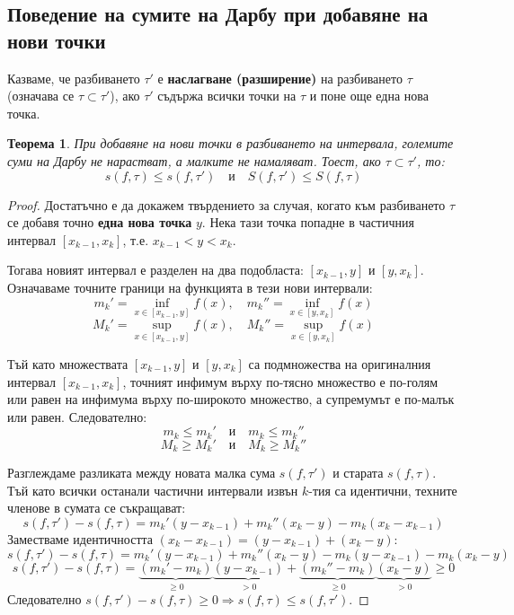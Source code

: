 \documentclass{scrartcl}
\newtheorem{theorem}{Теорема}
\begin{document}
\begin{FlushLeft}
\subsection{Поведение на сумите на Дарбу при добавяне на нови точки}

Казваме, че разбиването $\tau'$ е \textbf{наслагване (разширение)} на разбиването $\tau$ (означава се $\tau \subset \tau'$), ако $\tau'$ съдържа всички точки на $\tau$ и поне още една нова точка.

\begin{theorem}
При добавяне на нови точки в разбиването на интервала, големите суми на Дарбу не нарастват, а малките не намаляват. Тоест, ако $\tau \subset \tau'$, то:
\[ s(f, \tau) \le s(f, \tau') \quad \text{и} \quad S(f, \tau') \le S(f, \tau) \]
\end{theorem}

\begin{proof}
Достатъчно е да докажем твърдението за случая, когато към разбиването $\tau$ се добавя точно \textbf{една нова точка} $y$. Нека тази точка попадне в частичния интервал $[x_{k-1}, x_k]$, т.е. $x_{k-1} < y < x_k$.

Тогава новият интервал е разделен на два подобласта: $[x_{k-1}, y]$ и $[y, x_k]$. Означаваме точните граници на функцията в тези нови интервали:
\[ m_k' = \inf_{x \in [x_{k-1}, y]} f(x), \quad m_k'' = \inf_{x \in [y, x_k]} f(x) \]
\[ M_k' = \sup_{x \in [x_{k-1}, y]} f(x), \quad M_k'' = \sup_{x \in [y, x_k]} f(x) \]

Тъй като множествата $[x_{k-1}, y]$ и $[y, x_k]$ са подмножества на оригиналния интервал $[x_{k-1}, x_k]$, точният инфимум върху по-тясно множество е по-голям или равен на инфимума върху по-широкото множество, а супремумът е по-малък или равен. Следователно:
\[ m_k \le m_k' \quad \text{и} \quad m_k \le m_k'' \]
\[ M_k \ge M_k' \quad \text{и} \quad M_k \ge M_k'' \]

Разглеждаме разликата между новата малка сума $s(f, \tau')$ и старата $s(f, \tau)$. Тъй като всички останали частични интервали извън $k$-тия са идентични, техните членове в сумата се съкращават:
\[ s(f, \tau') - s(f, \tau) = m_k'(y - x_{k-1}) + m_k''(x_k - y) - m_k(x_k - x_{k-1}) \]
Заместваме идентичността $(x_k - x_{k-1}) = (y - x_{k-1}) + (x_k - y)$:
\[ s(f, \tau') - s(f, \tau) = m_k'(y - x_{k-1}) + m_k''(x_k - y) - m_k(y - x_{k-1}) - m_k(x_k - y) \]
\[ s(f, \tau') - s(f, \tau) = \underbrace{(m_k' - m_k)}_{\ge 0}\underbrace{(y - x_{k-1})}_{> 0} + \underbrace{(m_k'' - m_k)}_{\ge 0}\underbrace{(x_k - y)}_{> 0} \ge 0 \]
Следователно $s(f, \tau') - s(f, \tau) \ge 0 \Rightarrow s(f, \tau) \le s(f, \tau')$.


\end{proof}
\end{FlushLeft}
\end{document}
